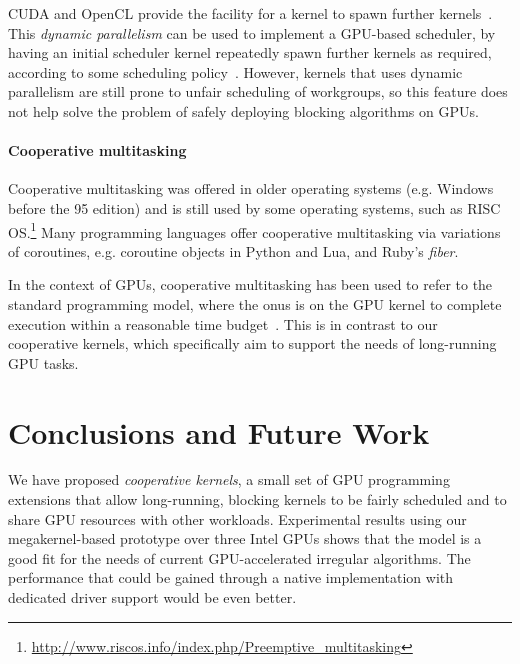 \documentclass[numbers,nocopyrightspace,10pt]{sigplanconf}
\begin{document}
CUDA and OpenCL provide the facility for a kernel to spawn further kernels~\cite{cuda-75,opencl2Spec}.
This \emph{dynamic parallelism} can be used to implement a
GPU-based scheduler, by having an initial scheduler kernel repeatedly
spawn further kernels as required, according to some scheduling
policy~\cite{DBLP:conf/ppopp/Muyan-OzcelikO16}.  However, kernels
that uses dynamic parallelism are still prone to unfair scheduling of workgroups, so this feature
does not help solve the problem of safely deploying blocking
algorithms on GPUs.

\paragraph{Cooperative multitasking}

Cooperative multitasking was offered in older operating systems
(e.g. Windows before the 95 edition) and is still used by some
operating systems, such as RISC
OS.\footnote{\url{http://www.riscos.info/index.php/Preemptive_multitasking}}
Many programming languages offer cooperative multitasking via
variations of coroutines, e.g. coroutine objects in
Python
and Lua,
and Ruby's
\emph{fiber}.

In the context of GPUs, cooperative multitasking has been used to
refer to the standard programming model, where the onus is on the GPU kernel
to complete execution within a reasonable time budget~\cite{adriaens2012case,CPE:CPE1722}.
%
This is in contrast to our cooperative kernels, which specifically aim to support the needs of long-running GPU tasks.


\section{Conclusions and Future Work}\label{sec:conclusion}

We have proposed \emph{cooperative kernels}, a small set of GPU
programming extensions that allow long-running, blocking kernels to be
fairly scheduled and to share GPU resources with other workloads.
Experimental results using our megakernel-based prototype over three
Intel GPUs shows that the model is a good fit for the needs of current
GPU-accelerated irregular algorithms.  The
performance that could be gained through a native implementation with
dedicated driver support would be even better.
\end{document}
